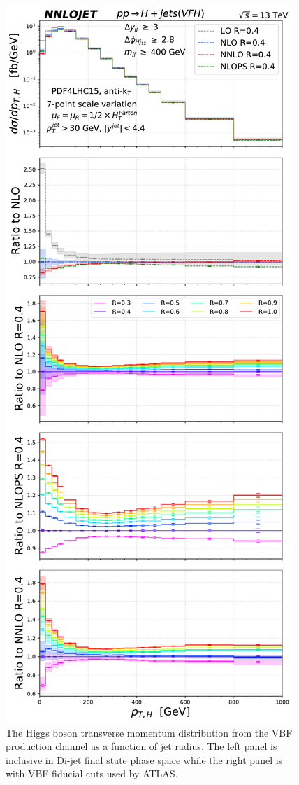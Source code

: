 \documentclass[10pt,prd,fleqn,superscriptaddress,notitlepage,nofootinbib,preprintnumbers,nobalancelastpage]{revtex4-1}
\newcommand{\VBF}{VBF\xspace}
\begin{document}
\begin{figure}[p]
\includegraphics[scale=0.44]{figures/rdep/LH19VFH_pth_largebin_ATLAS.pdf}
\caption{The Higgs boson transverse momentum distribution from the \VBF production channel as a function of jet radius. The left panel is inclusive in Di-jet final state phase space while the right panel is with VBF fiducial cuts used by ATLAS.}
\label{fig:fig_Higgs_pT_NNLO_incandATLAS}
\end{figure}
\end{document}
